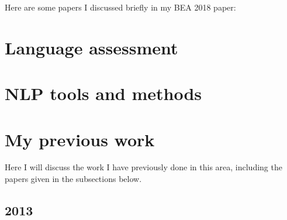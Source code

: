 Here are some papers I discussed briefly in my BEA 2018 paper:

\cite{leacock:ea:14}

\cite{kyle2015automatically}

\cite{weigle2013english}

\cite{amaral:meurers:user:07}

\cite{Meurers.Dickinson-17}

\cite{heift:schulze:07}

\cite{somasundaran:ea:15}

\cite{bailey:meurers:08}

\cite{meurers2011evaluating}

\cite{somasundaran:chodorow:14}

\cite{cahill-et-al:14}

\cite{ragheb:dickinson:14a}

\cite{foster2009native}

\cite{cho2013investigating}

\cite{landis1977measurement}

\cite{artstein:massimo:2008}

\cite{tetreault-chodorow:2008:HJCL}

\cite{tetreault:chodorow:08}

\section{Language assessment}
\label{section:languageAssessment}

\section{NLP tools and methods}
\label{section:NLP}

\section{My previous work}
\label{section:myPreviousWork}
Here I will discuss the work I have previously done in this area, including the papers given in the subsections below.

\subsection{2013}
\cite{king:dickinson:13}

